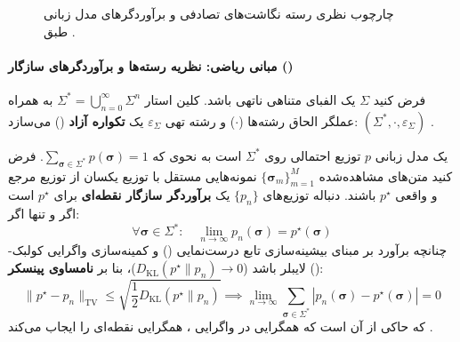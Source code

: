 \begin{figure}[htbp]
{%
}
\caption{چارچوب نظری رسته نگاشت‌های تصادفی و برآوردگرهای مدل زبانی طبق \cite{gastaldi2025foundations}.}
\label{fig:gastaldi_category}
\end{figure}

\paragraph*{مبانی ریاضی: نظریه رسته‌ها و برآوردگرهای سازگار ()}
فرض کنید $\Sigma$ یک الفبای متناهی ناتهی باشد. کلین استار $\Sigma^* = \bigcup_{n=0}^\infty \Sigma^n$ به همراه عملگر الحاق رشته‌ها ($\cdot$) و رشته تهی $\varepsilon_\Sigma$ یک \textbf{تکواره آزاد} () می‌سازد: $(\Sigma^*, \cdot, \varepsilon_\Sigma)$ \cite{gastaldi2025foundations}. 

یک مدل زبانی $p$ توزیع احتمالی روی $\Sigma^*$ است به نحوی که $\sum_{\boldsymbol{\sigma} \in \Sigma^*} p(\boldsymbol{\sigma}) = 1$. فرض کنید متن‌های مشاهده‌شده $\{\boldsymbol{\sigma}_m\}_{m=1}^M$ نمونه‌هایی مستقل با توزیع یکسان از توزیع مرجع و واقعی $p^\star$ باشند. دنباله توزیع‌های $\{p_n\}$ یک \textbf{برآوردگر سازگار نقطه‌ای} برای $p^\star$ است اگر و تنها اگر:
\begin{equation}
    \forall \boldsymbol{\sigma} \in \Sigma^*: \quad \lim_{n \to \infty} p_n(\boldsymbol{\sigma}) = p^\star(\boldsymbol{\sigma})
\end{equation}
چنانچه برآورد بر مبنای بیشینه‌سازی تابع درست‌نمایی () و کمینه‌سازی واگرایی کولبک-لایبلر باشد ($D_{\mathrm{KL}}(p^\star \parallel p_n) \to 0$)، بنا بر \textbf{نامساوی پینسکر} ():
\begin{equation}
    \|p^\star - p_n\|_{\mathrm{TV}} \le \sqrt{\frac{1}{2} D_{\mathrm{KL}}(p^\star \parallel p_n)} \implies \lim_{n \to \infty} \sum_{\boldsymbol{\sigma} \in \Sigma^*} |p_n(\boldsymbol{\sigma}) - p^\star(\boldsymbol{\sigma})| = 0
\end{equation}
که حاکی از آن است که همگرایی در واگرایی ، همگرایی نقطه‌ای را ایجاب می‌کند \cite{gastaldi2025foundations}.

